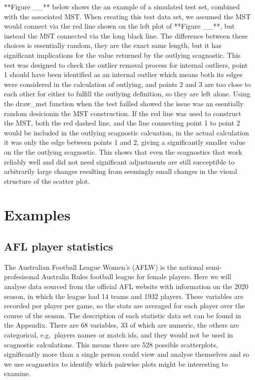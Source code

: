 **Figure \_\_** below shows the an example of a simulated test set,
combined with the associated MST. When creating this test data set, we
assumed the MST would connect via the red line shown on the left plot of
**Figure \_\_**, but instead the MST connected via the long black line.
The difference between these choices is essentially random, they are the
exact same length, but it has significant implications for the value
returned by the outlying scagnostic. This test was designed to check the
outlier removal process for internal outliers, point 1 should have been
identified as an internal outlier which means both its edges were
considered in the calculation of outlying, and points 2 and 3 are too
close to each other for either to fulfill the outlying definition, so
they are left alone. Using the draw\_mst function when the test failled
showed the issue was an esentially random desicionin the MST
construction. If the red line was used to construct the MST, both the
red dashed line, and the line connecting point 1 to point 2 would be
included in the outlying scagnostic calcuation, in the actual
calculation it was only the edge between points 1 and 2, giving a
significantly smaller value on the the outlying scagnostic. This shows
that even the scagnostics that work reliably well and did not need
significant adjustments are still succeptible to arbitrarily large
changes resulting from seemingly small changes in the visual structure
of the scatter plot.

\hypertarget{examples}{%
\section{Examples}\label{examples}}

\hypertarget{afl-player-statistics}{%
\subsection{AFL player statistics}\label{afl-player-statistics}}

The Australian Football League Women's (AFLW) is the national
semi-profesisonal Australia Rules football league for female players.
Here we will analyse data sourced from the official AFL website with
information on the 2020 season, in which the league had 14 teams and
1932 players. These variables are recorded per player per game, so the
stats are averaged for each player over the course of the season. The
description of each statistic data set can be found in the Appendix.
There are 68 variables, 33 of which are numeric, the others are
categorical, e.g.~players names or match ids, and they would not be used
in scagnostic calculations. This means there are 528 possible
scatterplots, significantly more than a single person could view and
analyse themselves and so we use scagnostics to identify which pairwise
plots might be interesting to examine.

